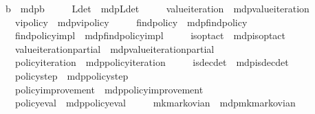 \begin{isabellebody}
\ \ \ {\isasymL}\isactrlsub b\ {\isacharequal}{\kern0pt}\ mdp{\isachardot}{\kern0pt}{\isasymL}\isactrlsub b\isanewline
\ \ \ \ \ L{\isacharunderscore}{\kern0pt}det\ {\isacharequal}{\kern0pt}\ mdp{\isachardot}{\kern0pt}L{\isacharunderscore}{\kern0pt}det\isanewline
\ \ \ \ \ value{\isacharunderscore}{\kern0pt}iteration\ {\isacharequal}{\kern0pt}\ mdp{\isachardot}{\kern0pt}value{\isacharunderscore}{\kern0pt}iteration\isanewline
\ \ \ \ \ vi{\isacharunderscore}{\kern0pt}policy{\isacharprime}{\kern0pt}\ {\isacharequal}{\kern0pt}\ mdp{\isachardot}{\kern0pt}vi{\isacharunderscore}{\kern0pt}policy{\isacharprime}{\kern0pt}\isanewline
\ \ \ \ \ find{\isacharunderscore}{\kern0pt}policy{\isacharprime}{\kern0pt}\ {\isacharequal}{\kern0pt}\ mdp{\isachardot}{\kern0pt}find{\isacharunderscore}{\kern0pt}policy{\isacharprime}{\kern0pt}\isanewline
\ \ \ \ \ find{\isacharunderscore}{\kern0pt}policy{\isacharunderscore}{\kern0pt}impl\ {\isacharequal}{\kern0pt}\ mdp{\isachardot}{\kern0pt}find{\isacharunderscore}{\kern0pt}policy{\isacharunderscore}{\kern0pt}impl\isanewline
\ \ \ \ \ is{\isacharunderscore}{\kern0pt}opt{\isacharunderscore}{\kern0pt}act\ {\isacharequal}{\kern0pt}\ mdp{\isachardot}{\kern0pt}is{\isacharunderscore}{\kern0pt}opt{\isacharunderscore}{\kern0pt}act\isanewline
\ \ \ \ \ value{\isacharunderscore}{\kern0pt}iteration{\isacharunderscore}{\kern0pt}partial\ {\isacharequal}{\kern0pt}\ mdp{\isachardot}{\kern0pt}value{\isacharunderscore}{\kern0pt}iteration{\isacharunderscore}{\kern0pt}partial\isanewline
\ \ \ \ \ policy{\isacharunderscore}{\kern0pt}iteration\ {\isacharequal}{\kern0pt}\ mdp{\isachardot}{\kern0pt}policy{\isacharunderscore}{\kern0pt}iteration\isanewline
\ \ \ \ \ is{\isacharunderscore}{\kern0pt}dec{\isacharunderscore}{\kern0pt}det\ {\isacharequal}{\kern0pt}\ mdp{\isachardot}{\kern0pt}is{\isacharunderscore}{\kern0pt}dec{\isacharunderscore}{\kern0pt}det\isanewline
\ \ \ \ \ policy{\isacharunderscore}{\kern0pt}step\ {\isacharequal}{\kern0pt}\ mdp{\isachardot}{\kern0pt}policy{\isacharunderscore}{\kern0pt}step\isanewline
\ \ \ \ \ policy{\isacharunderscore}{\kern0pt}improvement\ {\isacharequal}{\kern0pt}\ mdp{\isachardot}{\kern0pt}policy{\isacharunderscore}{\kern0pt}improvement\isanewline
\ \ \ \ \ policy{\isacharunderscore}{\kern0pt}eval\ {\isacharequal}{\kern0pt}\ mdp{\isachardot}{\kern0pt}policy{\isacharunderscore}{\kern0pt}eval\isanewline
\ \ \ \ \ mk{\isacharunderscore}{\kern0pt}markovian\ {\isacharequal}{\kern0pt}\ mdp{\isachardot}{\kern0pt}mk{\isacharunderscore}{\kern0pt}markovian\isanewline

\end{isabellebody}
